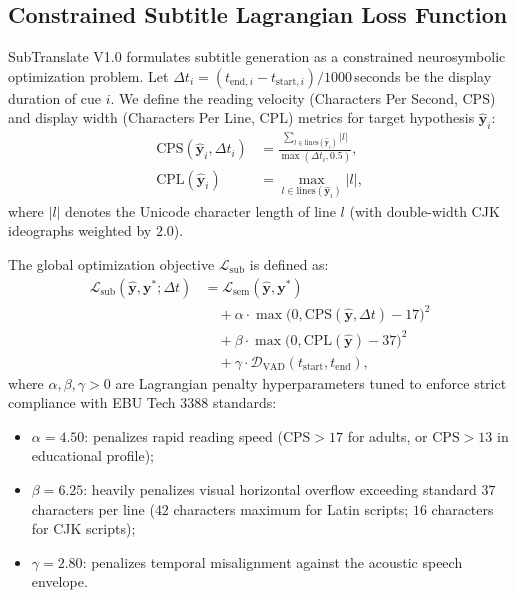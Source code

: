 \documentclass[11pt,a4paper,reqno]{article}
\theoremstyle{definition}
\theoremstyle{remark}
\begin{document}
\subsection{Constrained Subtitle Lagrangian Loss Function}
SubTranslate V1.0 formulates subtitle generation as a constrained neurosymbolic optimization problem. Let $\Delta t_i = (t_{\text{end}, i} - t_{\text{start}, i}) / 1000$\,seconds be the display duration of cue $i$. We define the reading velocity (Characters Per Second, $\text{CPS}$) and display width (Characters Per Line, $\text{CPL}$) metrics for target hypothesis $\hat{\mathbf{y}}_i$:
\begin{align}
\text{CPS}(\hat{\mathbf{y}}_i, \Delta t_i) &= \frac{\sum_{l \in \mathrm{lines}(\hat{\mathbf{y}}_i)} |l|}{\max(\Delta t_i, 0.5)}, \\
\text{CPL}(\hat{\mathbf{y}}_i) &= \max_{l \in \mathrm{lines}(\hat{\mathbf{y}}_i)} |l|,
\end{align}
where $|l|$ denotes the Unicode character length of line $l$ (with double-width CJK ideographs weighted by $2.0$).

The global optimization objective $\mathcal{L}_{\text{sub}}$ is defined as:
\begin{equation}
\label{eq:l_sub}
\begin{aligned}
\mathcal{L}_{\mathrm{sub}}(\hat{\mathbf{y}}, \mathbf{y}^*; \Delta t) &= \mathcal{L}_{\mathrm{sem}}(\hat{\mathbf{y}}, \mathbf{y}^*) \\
&\quad + \alpha \cdot \max\bigl(0, \text{CPS}(\hat{\mathbf{y}}, \Delta t) - 17\bigr)^2 \\
&\quad + \beta \cdot \max\bigl(0, \text{CPL}(\hat{\mathbf{y}}) - 37\bigr)^2 \\
&\quad + \gamma \cdot \mathcal{D}_{\mathrm{VAD}}(t_{\mathrm{start}}, t_{\mathrm{end}}),
\end{aligned}
\end{equation}
where $\alpha, \beta, \gamma > 0$ are Lagrangian penalty hyperparameters tuned to enforce strict compliance with EBU Tech 3388 standards:
\begin{itemize}
    \item $\alpha = 4.50$: penalizes rapid reading speed ($\text{CPS} > 17$ for adults, or $\text{CPS} > 13$ in educational profile);
    \item $\beta = 6.25$: heavily penalizes visual horizontal overflow exceeding standard $37$ characters per line ($42$ characters maximum for Latin scripts; $16$ characters for CJK scripts);
    \item $\gamma = 2.80$: penalizes temporal misalignment against the acoustic speech envelope.
\end{itemize}
\end{document}
